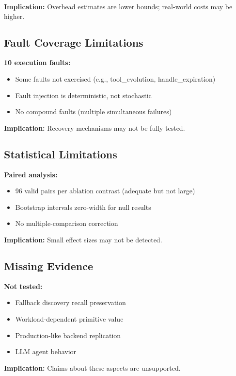 \textbf{Implication:} Overhead estimates are lower bounds; real-world costs may be higher.

\subsection{Fault Coverage Limitations}

\textbf{10 execution faults:}
\begin{itemize}
    \item Some faults not exercised (e.g., tool\_evolution, handle\_expiration)
    \item Fault injection is deterministic, not stochastic
    \item No compound faults (multiple simultaneous failures)
\end{itemize}

\textbf{Implication:} Recovery mechanisms may not be fully tested.

\subsection{Statistical Limitations}

\textbf{Paired analysis:}
\begin{itemize}
    \item 96 valid pairs per ablation contrast (adequate but not large)
    \item Bootstrap intervals zero-width for null results
    \item No multiple-comparison correction
\end{itemize}

\textbf{Implication:} Small effect sizes may not be detected.

\subsection{Missing Evidence}

\textbf{Not tested:}
\begin{itemize}
    \item Fallback discovery recall preservation
    \item Workload-dependent primitive value
    \item Production-like backend replication
    \item LLM agent behavior
\end{itemize}

\textbf{Implication:} Claims about these aspects are unsupported.


